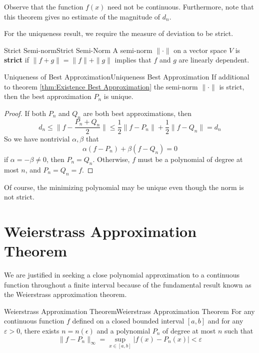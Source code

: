 \documentclass[../main.tex]{subfiles}
\begin{document}
\begin{remark}
	Observe that the function $f(x)$ need not be continuous. Furthermore, note that this theorem gives no estimate of the magnitude of $d_n$.
\end{remark}

For the uniqueness result, we require the measure of deviation to be strict.
\begin{definition}{Strict Semi-norm}{Strict Semi-Norm}
	A semi-norm $\| \cdot \|$ on a vector space $V$ is \textbf{strict} if $\|f + g\| = \|f\| + \|g\|$ implies that $f$ and $g$ are linearly dependent.
\end{definition}

\begin{theorem}{Uniqueness of Best Approximation}{Uniqueness Best Approximation}
	If additional to theorem \ref{thm:Existence Best Approximation} the semi-norm $\| \cdot \|$ is strict, then the best approximation $P_n$ is unique.
\end{theorem}
\begin{proof}
	If both $P_n$ and $Q_n$ are both best approximations, then
	\begin{equation*}
		d_n \leq \| f - \frac{P_n + Q_n}{2} \| \leq \frac{1}{2} \| f - P_n \| + \frac{1}{2} \| f - Q_n \| = d_n
	\end{equation*}
	So we have nontrivial $\alpha, \beta$ that
	\begin{equation*}
		\alpha(f - P_n) + \beta(f - Q_n) = 0
	\end{equation*}
	if $\alpha = -\beta \neq 0$, then $P_n = Q_n$. Otherwise, $f$ must be a polynomial of degree at most $n$, and $P_n = Q_n = f$.
\end{proof}

Of course, the minimizing polynomial may be unique even though the norm is not strict.

\section{Weierstrass Approximation Theorem}
We are justified in seeking a close polynomial approximation to a continuous function throughout a finite interval because of the fundamental result known as the Weierstrass approximation theorem.

\begin{theorem}{Weierstrass Approximation Theorem}{Weierstrass Approximation Theorem}
	For any continuous function $f$ defined on a closed bounded interval $[a,b]$ and for any $\varepsilon > 0$, there exists $n = n(\epsilon)$ and a polynomial $P_n$ of degree at most $n$ such that
	\begin{equation}
		\| f - P_n \|_\infty = \sup_{x \in [a,b]} |f(x) - P_n(x)| < \varepsilon
	\end{equation}
\end{theorem}
\end{document}
